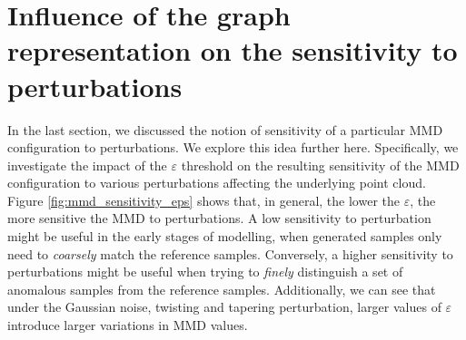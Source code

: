 \section{Influence of the graph representation on the sensitivity to perturbations}\label{sec:results_sensitivity}

In the last section, we discussed the notion of sensitivity of a particular MMD
configuration to perturbations. We explore this idea further here. Specifically,
we investigate the impact of the $\varepsilon$ threshold on the resulting
sensitivity of the MMD configuration to various perturbations affecting the
underlying point cloud. Figure \ref{fig:mmd_sensitivity_eps} shows that, in
general, the lower the $\varepsilon$, the more sensitive the MMD to
perturbations. A low sensitivity to perturbation might be useful in the early
stages of modelling, when generated samples only need to \emph{coarsely} match
the reference samples. Conversely, a higher sensitivity to perturbations might
be useful when trying to \emph{finely} distinguish a set of anomalous samples
from the reference samples. Additionally, we can see that under the Gaussian
noise, twisting and tapering perturbation, larger values of $\varepsilon$
introduce larger variations in MMD values.

